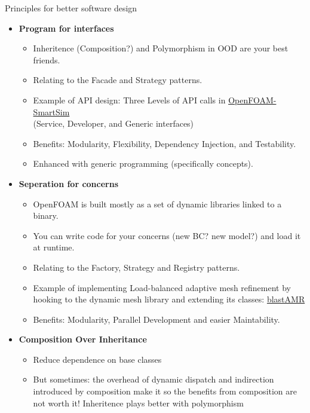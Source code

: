 \begin{frame}{Principles for better software design}

\begin{itemize}
    \item \textbf{Program for interfaces}
    \begin{itemize}
        \item Inheritence (Composition?) and Polymorphism in OOD are your best friends.
        \item Relating to the Facade and Strategy patterns.
        \item Example of API design: Three Levels of API calls in
            \href{https://github.com/OFDataCommittee/openfoam-smartsim/blob/main/docs.md}{OpenFOAM-SmartSim}
            \\(Service, Developer, and Generic interfaces)
        \item Benefits: Modularity, Flexibility, Dependency Injection, and Testability.
        \item Enhanced with generic programming (specifically concepts).
    \end{itemize}
    \pagebreak
    \item \textbf{Seperation for concerns}
    \begin{itemize}
        \item OpenFOAM is built mostly as a set of dynamic libraries linked to a binary.
        \item You can write code for your concerns (new BC? new model?) and load it at runtime.
        \item Relating to the Factory, Strategy and Registry patterns.
        \item Example of implementing Load-balanced adaptive mesh refinement by hooking to the
            dynamic mesh library and extending its classes:
            \href{https://github.com/STFS-TUDa/blastAMR}{blastAMR}
        \item Benefits: Modularity, Parallel Development and easier Maintability.
    \end{itemize}
    \pagebreak
    \item \textbf{Composition Over Inheritance}
    \begin{itemize}
        \item Reduce dependence on base classes
        \item But sometimes: the overhead of dynamic dispatch and indirection introduced by composition make it so
        the benefits from composition are not worth it! Inheritence plays better with polymorphism

\end{itemize}
\end{itemize}
\end{frame}
